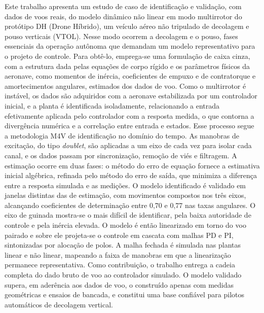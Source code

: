 Este trabalho apresenta um estudo de caso de identificação e validação, com dados de voos reais, do modelo dinâmico não linear em modo multirrotor do protótipo DH (Drone Híbrido), um veículo aéreo não tripulado de decolagem e pouso verticais (VTOL). Nesse modo ocorrem a decolagem e o pouso, fases essenciais da operação autônoma que demandam um modelo representativo para o projeto de controle. Para obtê-lo, emprega-se uma formulação de caixa cinza, com a estrutura dada pelas equações de corpo rígido e os parâmetros físicos da aeronave, como momentos de inércia, coeficientes de empuxo e de contratorque e amortecimentos angulares, estimados dos dados de voo. Como o multirrotor é instável, os dados são adquiridos com a aeronave estabilizada por um controlador inicial, e a planta é identificada isoladamente, relacionando a entrada efetivamente aplicada pelo controlador com a resposta medida, o que contorna a divergência numérica e a correlação entre entrada e estados. Esse processo segue a metodologia M4V de identificação no domínio do tempo. As manobras de excitação, do tipo \textit{doublet}, são aplicadas a um eixo de cada vez para isolar cada canal, e os dados passam por sincronização, remoção de viés e filtragem. A estimação ocorre em duas fases: o método do erro de equação fornece a estimativa inicial algébrica, refinada pelo método do erro de saída, que minimiza a diferença entre a resposta simulada e as medições. O modelo identificado é validado em janelas distintas das de estimação, com movimentos compostos nos três eixos, alcançando coeficientes de determinação entre 0,70 e 0,77 nas taxas angulares. O eixo de guinada mostra-se o mais difícil de identificar, pela baixa autoridade de controle e pela inércia elevada. O modelo é então linearizado em torno do voo pairado e sobre ele projeta-se o controle em cascata com malhas PD e PI, sintonizadas por alocação de polos. A malha fechada é simulada nas plantas linear e não linear, mapeando a faixa de manobras em que a linearização permanece representativa. Como contribuição, o trabalho entrega a cadeia completa do dado bruto de voo ao controlador simulado. O modelo validado supera, em aderência aos dados de voo, o construído apenas com medidas geométricas e ensaios de bancada, e constitui uma base confiável para pilotos automáticos de decolagem vertical.

